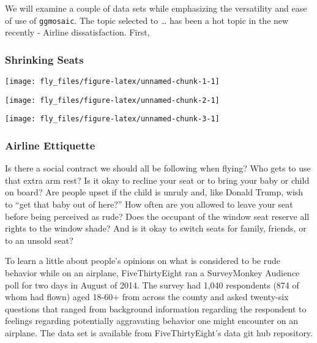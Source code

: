 We will examine a couple of data sets while emphasizing the versatility
and ease of use of \texttt{ggmosaic}. The topic selected to \ldots{} has
been a hot topic in the new recently - Airline dissatisfaction. First,

\subsubsection{Shrinking Seats}\label{shrinking-seats}

\begin{Schunk}


\begin{center}\texttt{[image: fly\_files/figure-latex/unnamed-chunk-1-1]} \end{center}

\end{Schunk}

\begin{Schunk}


\begin{center}\texttt{[image: fly\_files/figure-latex/unnamed-chunk-2-1]} \end{center}

\end{Schunk}

\begin{Schunk}


\begin{center}\texttt{[image: fly\_files/figure-latex/unnamed-chunk-3-1]} \end{center}

\end{Schunk}

\subsubsection{Airline Ettiquette}\label{airline-ettiquette}

Is there a social contract we should all be following when flying? Who
gets to use that extra arm rest? Is it okay to recline your seat or to
bring your baby or child on board? Are people upset if the child is
unruly and, like Donald Trump, wish to ``get that baby out of here?''
\citep{cnn} How often are you allowed to leave your seat before being
perceived as rude? Does the occupant of the window seat reserve all
rights to the window shade? And is it okay to switch seats for family,
friends, or to an unsold seat?

To learn a little about people's opinions on what is considered to be
rude behavior while on an airplane, FiveThirtyEight ran a SurveyMonkey
Audience poll for two days in August of 2014. \citep{fivethirtyeight}
The survey had 1,040 respondents (874 of whom had flown) aged 18-60+
from across the county and asked twenty-six questions that ranged from
background information regarding the respondent to feelings regarding
potentially aggravating behavior one might encounter on an airplane. The
data set is available from FiveThirtyEight's data git hub repository.


